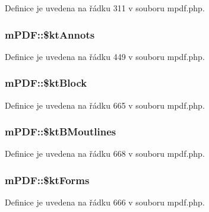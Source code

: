 Definice je uvedena na řádku 311 v souboru mpdf.\-php.

\hypertarget{classm_p_d_f_ad1e94c2e650e8e3a2fb00735377fc9fb}{
\subsubsection[{\$kt\-Annots}]{\setlength{\rightskip}{0pt plus 5cm}m\-P\-D\-F\-::\$kt\-Annots}}\label{classm_p_d_f_ad1e94c2e650e8e3a2fb00735377fc9fb}


Definice je uvedena na řádku 449 v souboru mpdf.\-php.

\hypertarget{classm_p_d_f_a2219c6a1c3d263e274d108fed5dde5fa}{
\subsubsection[{\$kt\-Block}]{\setlength{\rightskip}{0pt plus 5cm}m\-P\-D\-F\-::\$kt\-Block}}\label{classm_p_d_f_a2219c6a1c3d263e274d108fed5dde5fa}


Definice je uvedena na řádku 665 v souboru mpdf.\-php.

\hypertarget{classm_p_d_f_a7d8400347df095a776f241ad6058652b}{
\subsubsection[{\$kt\-B\-Moutlines}]{\setlength{\rightskip}{0pt plus 5cm}m\-P\-D\-F\-::\$kt\-B\-Moutlines}}\label{classm_p_d_f_a7d8400347df095a776f241ad6058652b}


Definice je uvedena na řádku 668 v souboru mpdf.\-php.

\hypertarget{classm_p_d_f_a6e93b00ddda2a234d4c0c66d787165f8}{
\subsubsection[{\$kt\-Forms}]{\setlength{\rightskip}{0pt plus 5cm}m\-P\-D\-F\-::\$kt\-Forms}}\label{classm_p_d_f_a6e93b00ddda2a234d4c0c66d787165f8}


Definice je uvedena na řádku 666 v souboru mpdf.\-php.

